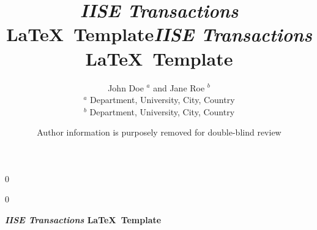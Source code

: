 \documentclass[11pt]{article}
\newcommand{\blind}{0}
\begin{document}
		
		\def\spacingset#1{\renewcommand{\baselinestretch}%
			{#1}\small\normalsize} \spacingset{1}
		
		\blind
		{
			\title{\bf \emph{IISE Transactions} \LaTeX \ Template}
			\author{John Doe $^a$ and Jane Roe $^b$ \\
			$^a$ Department, University, City, Country \\
             $^b$ Department, University, City, Country }
			\date{}
			\maketitle
		} \fi
		
		\blind
		{

            \title{\bf \emph{IISE Transactions} \LaTeX \ Template}
			\author{Author information is purposely removed for double-blind review}
			
\bigskip
			\bigskip
			\bigskip
			\begin{center}
				{\LARGE\bf \emph{IISE Transactions} \LaTeX \ Template}
			\end{center}
			\medskip
		} \fi
		\bigskip
		
\end{document}
